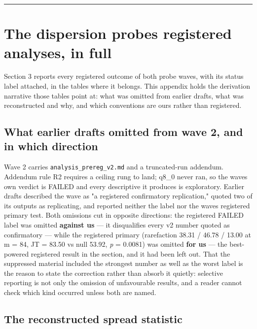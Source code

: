 \begin{center}\rule{0.5\linewidth}{0.5pt}\end{center}

\hypertarget{the-dispersion-probes-registered-analyses-in-full}{%
\appendix
\section{The dispersion probes\textquotesingle{} registered analyses, in full}\label{the-dispersion-probes-registered-analyses-in-full}}

Section 3 reports every registered outcome of both probe waves, with its status label attached, in the tables where it belongs. This appendix holds the derivation narrative those tables point at: what was omitted from earlier drafts, what was reconstructed and why, and which conventions are ours rather than registered.

\hypertarget{what-earlier-drafts-omitted-from-wave-2-and-in-which-direction}{%
\subsection{What earlier drafts omitted from wave 2, and in which direction}\label{what-earlier-drafts-omitted-from-wave-2-and-in-which-direction}}

Wave 2 carries \texttt{analysis\_prereg\_v2.md} and a truncated-run addendum. Addendum rule R2 requires a ceiling rung to land; q8\_0 never ran, so the wave\textquotesingle s own verdict is FAILED and every descriptive it produces is exploratory. Earlier drafts described the wave as "a registered confirmatory replication," quoted two of its outputs as replicating, and reported neither the label nor the wave\textquotesingle s registered primary test. Both omissions cut in opposite directions: the registered FAILED label was omitted \textbf{against us} --- it disqualifies every v2 number quoted as confirmatory --- while the registered primary (rarefaction 38.31 / 46.78 / 13.00 at m = 84, JT = 83.50 vs null 53.92, \emph{p} = 0.0081) was omitted \textbf{for us} --- the best-powered registered result in the section, and it had been left out. That the suppressed material included the strongest number as well as the worst label is the reason to state the correction rather than absorb it quietly: selective reporting is not only the omission of unfavourable results, and a reader cannot check which kind occurred unless both are named.

\hypertarget{the-reconstructed-spread-statistic}{%
\subsection{The reconstructed spread statistic}\label{the-reconstructed-spread-statistic}}

